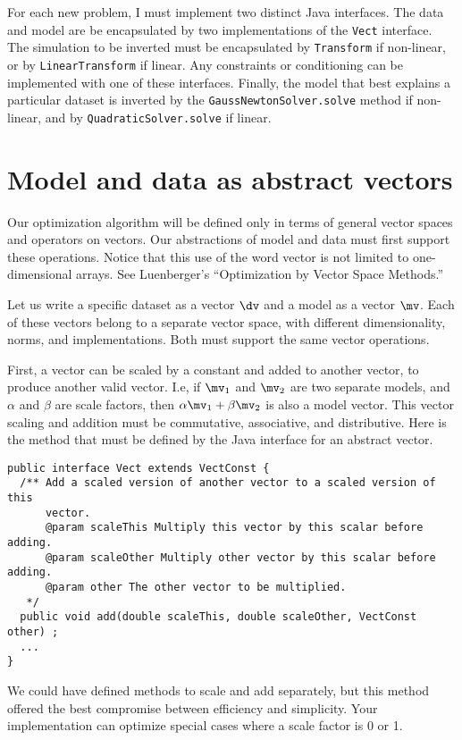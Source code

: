 \documentclass[12pt]{article}
\begin{document}
For each new problem, I must implement two
distinct Java interfaces.  The data and model
are be encapsulated by two implementations of
the \texttt{Vect} interface.  The simulation
to be inverted must be encapsulated by
\texttt{Transform} if non-linear, or by
\texttt{LinearTransform} if linear.  
Any constraints or conditioning can be
implemented with one of these interfaces.
Finally,
the model that best explains a particular
dataset is inverted by the
\texttt{Gauss\-Newton\-Solver.solve} method
if non-linear, and 
by \texttt{Quadratic\-Solver.solve} if linear.

\section {Model and data as abstract vectors}

Our optimization algorithm will be defined
only in terms of general vector spaces and
operators on vectors.  Our abstractions of
model and data must first support these
operations.  Notice that this use of the word
vector is not limited to one-dimensional
arrays.  See Luenberger's
\cite{luenbergervec} ``Optimization by Vector
Space Methods.''

Let us write a specific dataset as a vector
$\dv$ and a model as a vector $\mv$.  Each of
these vectors belong to a separate vector
space, with different dimensionality, norms,
and implementations.  Both must support the
same vector operations.

First, a vector can be scaled by a constant
and added to another vector, to produce
another valid vector.  I.e, if $\mv_1$ and
$\mv_2$ are two separate models, and $\alpha$
and $\beta$ are scale factors, then $\alpha
\mv_1 + \beta \mv_2$ is also a model vector.
This vector scaling and addition must be
commutative, associative, and distributive.
Here is the method that must be defined by
the Java interface for an abstract vector.

{\footnotesize \begin{verbatim} 
public interface Vect extends VectConst {
  /** Add a scaled version of another vector to a scaled version of this
      vector.
      @param scaleThis Multiply this vector by this scalar before adding.
      @param scaleOther Multiply other vector by this scalar before adding.
      @param other The other vector to be multiplied.
   */
  public void add(double scaleThis, double scaleOther, VectConst other) ;
  ...
}
\end{verbatim}} 

\noindent We could have defined methods to
scale and add separately, but this method
offered the best compromise between
efficiency and simplicity.  Your
implementation can optimize special cases
where a scale factor is 0 or 1.
\end{document}
